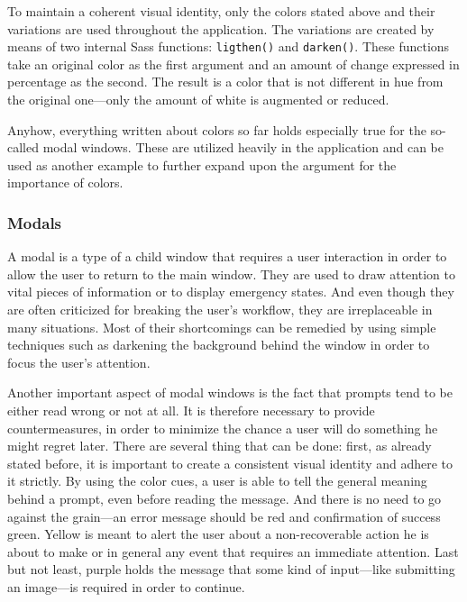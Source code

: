 \documentclass[thesis=M,english,hidelinks]{FITthesis}[2012/10/20]
\newcommand{\code}{\texttt}
\begin{document}
To maintain a coherent visual identity, only the colors stated above and their variations are used throughout the application. The variations are created by means of two internal Sass functions: \code{ligthen()} and \code{darken()}. These functions take an original color as the first argument and an amount of change expressed in percentage as the second. The result is a color that is not different in hue from the original one---only the amount of white is augmented or reduced.

Anyhow, everything written about colors so far holds especially true for the so-called modal windows. These are utilized heavily in the application and can be used as another example to further expand upon the argument for the importance of colors.

    \subsubsection{Modals}

A modal is a type of a child window that requires a user interaction in order to allow the user to return to the main window. They are used to draw attention to vital pieces of information or to display emergency states. And even though they are often criticized for breaking the user's workflow, they are irreplaceable in many situations. Most of their shortcomings can be remedied by using simple techniques such as darkening the background behind the window in order to focus the user's attention.

Another important aspect of modal windows is the fact that prompts tend to be either read wrong or not at all. It is therefore necessary to provide countermeasures, in order to minimize the chance a user will do something he might regret later. There are several thing that can be done: first, as already stated before, it is important to create a consistent visual identity and adhere to it strictly. By using the color cues, a user is able to tell the general meaning behind a prompt, even before reading the message. And there is no need to go against the grain---an error message should be red and confirmation of success green. Yellow is meant to alert the user about a non-recoverable action he is about to make or in general any event that requires an immediate attention. Last but not least, purple holds the message that some kind of input---like submitting an image---is required in order to continue.
\end{document}
